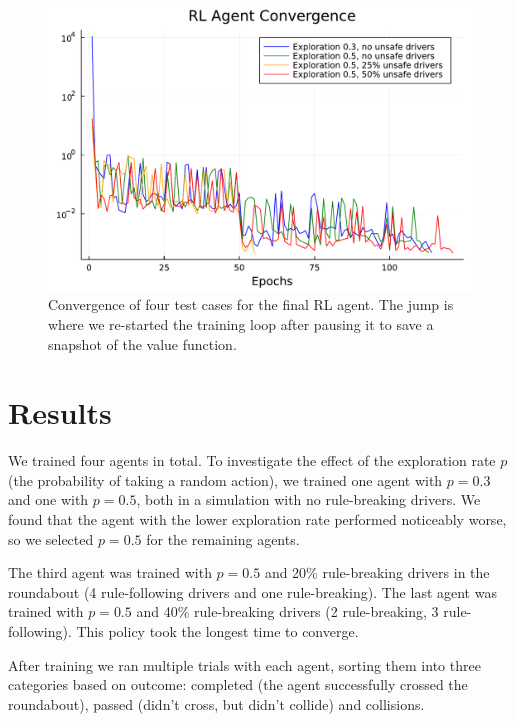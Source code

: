 \documentclass[conference]{IEEEtran}
\begin{document}
\begin{figure}[h!]
	\centering
	\includegraphics[width=1.0\linewidth]{figures/final_convergence.pdf}
	\caption{Convergence of four test cases for the final RL agent. The jump is where we re-started the training loop after pausing it to save a snapshot of the value function.}
	\label{fig:convergence}
\end{figure}

\section{Results}
 We trained four agents in total. To investigate the effect of the exploration rate $p$ (the probability of taking a random action), we trained one agent with $p=0.3$ and one with $p=0.5$, both in a simulation with no rule-breaking drivers. We found that the agent with the lower exploration rate performed noticeably worse, so we selected $p=0.5$ for the remaining agents.

The third agent was trained with $p=0.5$ and 20\% rule-breaking drivers in the roundabout (4 rule-following drivers and one rule-breaking).
The last agent was trained with $p=0.5$ and 40\% rule-breaking drivers (2 rule-breaking, 3 rule-following). This policy took the longest time to converge.

After training we ran multiple trials with each agent, sorting them into three categories based on outcome: completed (the agent successfully crossed the roundabout), passed (didn't cross, but didn't collide) and collisions.

\clearpage
\end{document}
